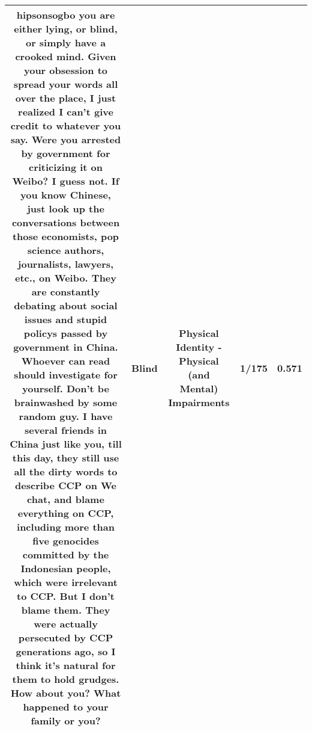 \documentclass[11pt]{article}
\newlength\mylength
\begin{document}
\begin{center}
\begin{longtable}{|C{.65\mylength}|C{.30\mylength}|C{.12\mylength}|C{.12\mylength}|C{.12\mylength}|}
  \small hipsonsogbo you are either lying, or \textbf{blind}, or simply have a crooked mind. Given your obsession to spread your words all over the place, I just realized I can't give credit to whatever you say. Were you arrested by government for criticizing it on Weibo? I guess not. If you know Chinese, just look up the conversations between those economists, pop science authors, journalists, lawyers, etc., on Weibo. They are constantly debating about social issues and stupid policys passed by government in China. Whoever can read should investigate for yourself. Don't be brainwashed by some random guy. I have several friends in China just like you, till this day, they still use all the dirty words to describe CCP on We chat, and blame everything on CCP, including more than five genocides committed by the Indonesian people, which were irrelevant to CCP. But I don't blame them. They were actually persecuted by CCP generations ago, so I think it's natural for them to hold grudges. How about you? What happened to your family or you?\normalsize   & Blind & Physical Identity - Physical (and Mental) Impairments & 1/175 & 0.571 \\  \hline

\end{longtable}
\end{center}
\end{document}
